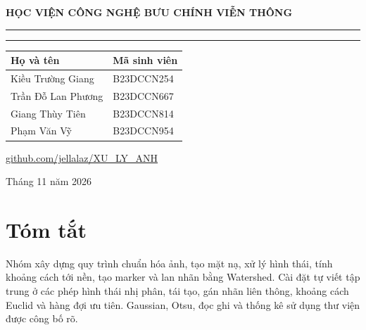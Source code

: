\documentclass[12pt,a4paper,oneside]{report}
\begin{document}
\hypersetup{pageanchor=false}
\begin{titlepage}\centering
{\large\bfseries HỌC VIỆN CÔNG NGHỆ BƯU CHÍNH VIỄN THÔNG}\par
\vspace{1cm}{\large BÁO CÁO BÀI TẬP LỚN}\par
\vspace{0.3cm}{\Large\bfseries MÔN XỬ LÝ ẢNH}\par
\vspace{1.2cm}\rule{\linewidth}{0.6pt}\par
\vspace{0.5cm}{\LARGE\bfseries PHÂN ĐOẠN ĐỐI TƯỢNG BẰNG\par HÌNH THÁI HỌC TOÁN HỌC\par VÀ WATERSHED}\par
\vspace{0.5cm}\rule{\linewidth}{0.6pt}\par
\vspace{0.8cm}{\large Nền tảng tham chiếu: Fiji/ImageJ -- MorphoLibJ}\par
\vspace{0.7cm}{\large\bfseries Nhóm 1}\par\vspace{0.4cm}
\begin{tabular}{ll}\toprule
\textbf{Họ và tên}&\textbf{Mã sinh viên}\\\midrule
Kiều Trường Giang&B23DCCN254\\
Trần Đỗ Lan Phương&B23DCCN667\\
Giang Thùy Tiên&B23DCCN814\\
Phạm Văn Vỹ&B23DCCN954\\\bottomrule
\end{tabular}
\vfill
\href{https://github.com/jellalaz/XU_LY_ANH}{github.com/jellalaz/XU\_LY\_ANH}\par
\vspace{0.5cm}Tháng 11 năm 2026
\end{titlepage}
\hypersetup{pageanchor=true}
\chapter*{Tóm tắt}
Nhóm xây dựng quy trình chuẩn hóa ảnh, tạo mặt nạ, xử lý hình thái, tính khoảng cách tới nền, tạo marker và lan nhãn bằng Watershed. Cài đặt tự viết tập trung ở các phép hình thái nhị phân, tái tạo, gán nhãn liên thông, khoảng cách Euclid và hàng đợi ưu tiên. Gaussian, Otsu, đọc ghi và thống kê sử dụng thư viện được công bố rõ.
\end{document}
